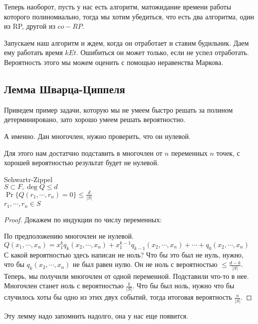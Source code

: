 Теперь наоборот, пусть у нас есть алгоритм, матожидание времени работы которого полиномиально, 
тогда мы хотим убедиться, что есть два алгоритма, один из RP, другой из $co-RP$.

Запускаем наш алгоритм и ждем, когда он отработает и ставим будильник. 
Даем ему работать время $k Et$. Ошибиться он может только, если не успел 
отработать. Вероятность этого мы можем оценить с помощью неравенства Маркова. 

\subsection{Лемма Шварца-Циппеля}

\begin{exmp} 
Приведем пример задачи, которую мы не умеем быстро решать за полином детерминировано, 
зато хорошо умеем решать вероятностно. 

А именно. Дан многочлен, нужно проверить, что он нулевой. 

Для этого нам достатчно подставить в многочлен от $n$ переменных $n$ точек, 
с хорошей вероятностью результат будет не нулевой. 

\begin{lemma} Sehwartr-Zippel\\
$S \subset F, \deg Q \le d$\\
$\Pr\{Q(r_1, \cdots, r_n) = 0\} \le \frac{d}{|S|}$\\
$r_1, \cdots, r_n \in S$\\
\end{lemma}
\begin{proof}
Докажем по индукции по числу переменных:

По предположению многочлен не нулевой. 
$Q(x_1, \cdots, x_n) = x_1^kq_k(x_2,\cdots, x_n) + x_1^{k - 1}q_{k - 1}(x_2, \cdots, x_n) + \cdots + q_0(x_2, \cdots, x_n)$\\
С какой вероятностью здесь написан не ноль? Что бы это был не нуль, нужно, что бы $q_k(x_2, \cdots, x_n)$ не был равен нулю. 
Он не ноль с вероятностью $\le \frac{d - k}{|S|}$. Теперь, мы получили многочлен от одной переменной. Подставили что-то в нее. 
Многочлен станет ноль с вероятностью $\frac{k}{|S|}$. Что бы был ноль, нужно что бы случилось хоты бы одно из этих двух событий, 
тогда итоговая вероятность $\frac{n}{|S|}$.
\end{proof}
\end{exmp}

Эту лемму надо запомнить надолго, она у нас еще появится.

